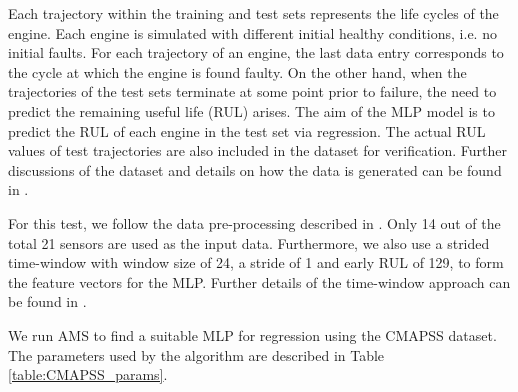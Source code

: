 \documentclass[preprint,12pt]{elsarticle}%
\begin{document}
Each trajectory within the training and test sets represents the life cycles of the engine. Each engine is simulated with different initial healthy conditions, i.e. no initial faults. For each trajectory of an engine, the last data entry corresponds to the cycle at which the engine is found faulty. On the other hand, when the trajectories of the test sets terminate at some point prior to failure, the need to predict the remaining useful life (RUL) arises. The aim of the MLP model is to predict the RUL of each engine in the test set via regression. The actual RUL values of test trajectories are also included in the dataset for verification. Further discussions of the dataset and details on how the data is generated can be found in \cite{Saxena2008}.

For this test, we follow the data pre-processing described in \cite{Laredo2018}. Only 14 out of the total 21 sensors are used as the input data. Furthermore, we also use a strided time-window with window size of 24, a stride of 1 and early RUL of 129, to form the feature vectors for the MLP. Further details of the time-window approach can be found in \cite{Laredo2018,Li2018}.

We run AMS to find a suitable MLP for regression using the CMAPSS dataset. The parameters used by the algorithm are described in Table \ref{table:CMAPSS_params}.

\begin{table}[H]
\begin{center}
\end{center}
\caption{Parameters for the CMAPSS dataset.}
\label{table:CMAPSS_params}
\end{table}
\end{document}
